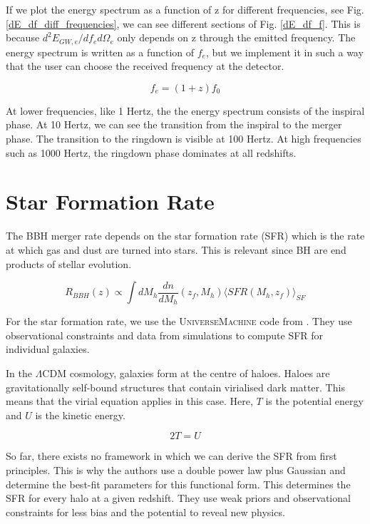 If we plot the energy spectrum as a function of z for different frequencies, see Fig. \ref{dE_df_diff_frequencies}, we can see different sections of Fig. \ref{dE_df_f}. This is because $d^2 E_{GW,e}/df_e d\Omega_e$ only depends on z through the emitted frequency. The energy spectrum is written as a function of $f_e$, but we implement it in such a way that the user can choose the received frequency at the detector.

\begin{equation}
    f_e = (1+z)f_0
\end{equation}

At lower frequencies, like 1 Hertz, the the energy spectrum consists of the inspiral phase. At 10 Hertz, we can see the transition from the inspiral to the merger phase. The transition to the ringdown is visible at 100 Hertz. At high frequencies such as 1000 Hertz, the ringdown phase dominates at all redshifts.

\section{Star Formation Rate}

The BBH merger rate depends on the star formation rate (SFR) which is the rate at which gas and dust are turned into stars. This is relevant since BH are end products of stellar evolution.

\begin{equation}
    R_{BBH}(z) \propto \int dM_h \frac{dn}{dM_h}(z_f, M_h)\langle SFR(M_h, z_f)\rangle_{SF}
\end{equation}


For the star formation rate, we use the \textsc{UniverseMachine} code from \cite{behroozi_universemachine_2019}. They use observational constraints and data from simulations to compute SFR for individual galaxies.

In the $\Lambda$CDM cosmology, galaxies form at the centre of haloes. Haloes are gravitationally self-bound structures that contain virialised dark matter. This means that the virial equation applies in this case. Here, $T$ is the potential energy and $U$ is the kinetic energy.

\begin{equation}
    2T=U
\end{equation}

So far, there exists no framework in which we can derive the SFR from first principles. This is why the authors use a double power law plus Gaussian and determine the best-fit parameters for this functional form. This determines the SFR for every halo at a given redshift. They use weak priors and observational constraints for less bias and the potential to reveal new physics.

